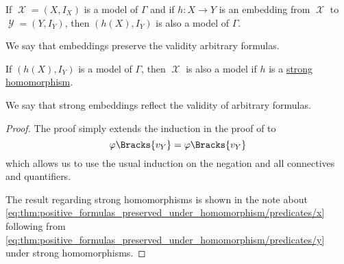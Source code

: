 \begin{proposition}\label{thm:arbitrary_formulas_preserved_under_isomorphisms}
  If \( \mscrX = (X, I_X) \) is a model of \( \Gamma \) and if \( h: X \to Y \) is an embedding from \( \mscrX \) to \( \mscrY = (Y, I_Y) \), then \( (h(X), I_Y) \) is also a model of \( \Gamma \).

  We say that embeddings preserve the validity arbitrary formulas.

  If \( (h(X), I_Y) \) is a model of \( \Gamma \), then \( \mscrX \) is also a model if \( h \) is a \hyperref[rem:first_order_strong_homomorphism]{strong homomorphism}.

  We say that strong embeddings reflect the validity of arbitrary formulas.
\end{proposition}
\begin{proof}
  The proof simply extends the induction in the proof of  to
  \begin{equation*}
    \varphi\Bracks{v_Y} = \varphi\Bracks{v_Y}
  \end{equation*}
  which allows us to use the usual induction on the negation and all connectives and quantifiers.

  The result regarding strong homomorphisms is shown in the note about \eqref{eq:thm:positive_formulas_preserved_under_homomorphism/predicates/x} following from \eqref{eq:thm:positive_formulas_preserved_under_homomorphism/predicates/y} under strong homomorphisms.
\end{proof}

